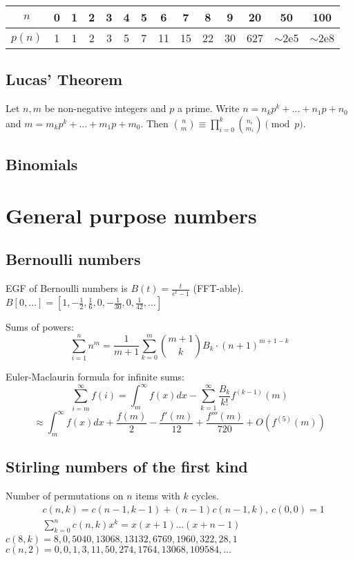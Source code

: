 		\begin{center}
		\begin{tabular}{c|c@{\ }c@{\ }c@{\ }c@{\ }c@{\ }c@{\ }c@{\ }c@{\ }c@{\ }c@{\ }c@{\ }c@{\ }c}
			$n$    & 0 & 1 & 2 & 3 & 4 & 5 & 6  & 7  & 8  & 9  & 20  & 50  & 100 \\ \hline
			$p(n)$ & 1 & 1 & 2 & 3 & 5 & 7 & 11 & 15 & 22 & 30 & 627 & $\mathtt{\sim}$2e5 & $\mathtt{\sim}$2e8 \\
		\end{tabular}
		\end{center}

	\subsection{Lucas' Theorem}
		Let $n,m$ be non-negative integers and $p$ a prime. Write $n=n_kp^k+...+n_1p+n_0$ and $m=m_kp^k+...+m_1p+m_0$. Then $\binom{n}{m} \equiv \prod_{i=0}^k\binom{n_i}{m_i} \pmod{p}$.

	\subsection{Binomials}

\section{General purpose numbers}
	\subsection{Bernoulli numbers}
		EGF of Bernoulli numbers is $B(t)=\frac{t}{e^t-1}$ (FFT-able).
		$B[0,\ldots] = [1, -\frac{1}{2}, \frac{1}{6}, 0, -\frac{1}{30}, 0, \frac{1}{42}, \ldots]$

		Sums of powers:
		\small
		\[ \sum_{i=1}^n n^m = \frac{1}{m+1} \sum_{k=0}^m \binom{m+1}{k} B_k \cdot (n+1)^{m+1-k} \]
		\normalsize

		Euler-Maclaurin formula for infinite sums:
		\small
		\[ \sum_{i=m}^{\infty} f(i) = \int_m^\infty f(x) dx - \sum_{k=1}^\infty \frac{B_k}{k!}f^{(k-1)}(m) \]
		\[ \approx \int_{m}^\infty f(x)dx + \frac{f(m)}{2} - \frac{f'(m)}{12} + \frac{f'''(m)}{720} + O(f^{(5)}(m)) \]
		\normalsize

	\subsection{Stirling numbers of the first kind}
		Number of permutations on $n$ items with $k$ cycles.
		\begin{align*}
			&c(n,k) = c(n-1,k-1) + (n-1) c(n-1,k),\ c(0,0) = 1 \\
			&\textstyle \sum_{k=0}^n c(n,k)x^k = x(x+1) \dots (x+n-1)
		\end{align*}
		$c(8,k) = 8, 0, 5040, 13068, 13132, 6769, 1960, 322, 28, 1$ \\
		$c(n,2) = 0, 0, 1, 3, 11, 50, 274, 1764, 13068, 109584, \dots$

